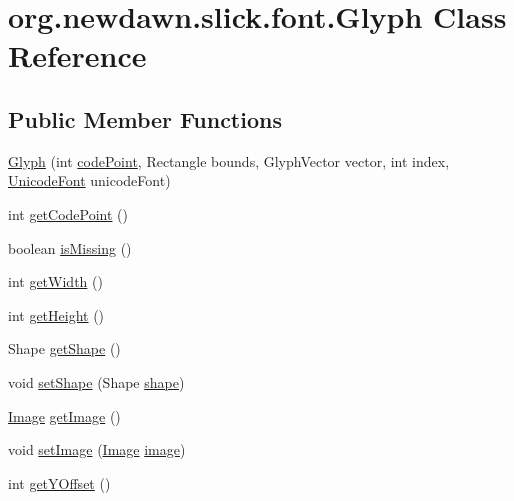 \hypertarget{classorg_1_1newdawn_1_1slick_1_1font_1_1_glyph}{}\section{org.\+newdawn.\+slick.\+font.\+Glyph Class Reference}
\label{classorg_1_1newdawn_1_1slick_1_1font_1_1_glyph}
\subsection*{Public Member Functions}
\begin{DoxyCompactItemize}
\item 
\mbox{\hyperlink{classorg_1_1newdawn_1_1slick_1_1font_1_1_glyph_a0bfc907228474ef5723f23da1fa10fc1}{Glyph}} (int \mbox{\hyperlink{classorg_1_1newdawn_1_1slick_1_1font_1_1_glyph_a7aea2e2bd765045b2457d58e14052e37}{code\+Point}}, Rectangle bounds, Glyph\+Vector vector, int index, \mbox{\hyperlink{classorg_1_1newdawn_1_1slick_1_1_unicode_font}{Unicode\+Font}} unicode\+Font)
\item 
int \mbox{\hyperlink{classorg_1_1newdawn_1_1slick_1_1font_1_1_glyph_a8950e9b59d7e7c08122bee9a4f1a0e29}{get\+Code\+Point}} ()
\item 
boolean \mbox{\hyperlink{classorg_1_1newdawn_1_1slick_1_1font_1_1_glyph_a2d0b164910c22c995b6cd62ed2f025cf}{is\+Missing}} ()
\item 
int \mbox{\hyperlink{classorg_1_1newdawn_1_1slick_1_1font_1_1_glyph_a7f5da97ec82f6546027ca72ba3e0e977}{get\+Width}} ()
\item 
int \mbox{\hyperlink{classorg_1_1newdawn_1_1slick_1_1font_1_1_glyph_a192eaf09655bda1f72198dae3fac9710}{get\+Height}} ()
\item 
Shape \mbox{\hyperlink{classorg_1_1newdawn_1_1slick_1_1font_1_1_glyph_ac103afec6c3df00c764a30e9d5175e86}{get\+Shape}} ()
\item 
void \mbox{\hyperlink{classorg_1_1newdawn_1_1slick_1_1font_1_1_glyph_ad8af498c35a839227c6b819ed6833a51}{set\+Shape}} (Shape \mbox{\hyperlink{classorg_1_1newdawn_1_1slick_1_1font_1_1_glyph_a128faa13d2bf71ee4ce3cd3a77e7682f}{shape}})
\item 
\mbox{\hyperlink{classorg_1_1newdawn_1_1slick_1_1_image}{Image}} \mbox{\hyperlink{classorg_1_1newdawn_1_1slick_1_1font_1_1_glyph_a8ea5d1d3778cc284aa0740c26f29f7bf}{get\+Image}} ()
\item 
void \mbox{\hyperlink{classorg_1_1newdawn_1_1slick_1_1font_1_1_glyph_a283dab0c8eb380fb5e4b137e15237d12}{set\+Image}} (\mbox{\hyperlink{classorg_1_1newdawn_1_1slick_1_1_image}{Image}} \mbox{\hyperlink{classorg_1_1newdawn_1_1slick_1_1font_1_1_glyph_af4fe8b4f2cdf72e687e7582fd5e210db}{image}})
\item 
int \mbox{\hyperlink{classorg_1_1newdawn_1_1slick_1_1font_1_1_glyph_a97cae1e3c340df60b6d376726e2939ed}{get\+Y\+Offset}} ()
\end{DoxyCompactItemize}
